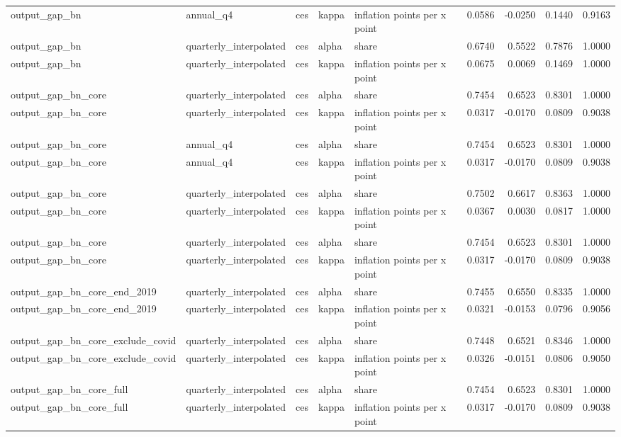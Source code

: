 \begin{tabular}{lllllrrrr}
output\_gap\_bn & annual\_q4 & ces & kappa & inflation points per x point & 0.0586 & -0.0250 & 0.1440 & 0.9163 \\
output\_gap\_bn & quarterly\_interpolated & ces & alpha & share & 0.6740 & 0.5522 & 0.7876 & 1.0000 \\
output\_gap\_bn & quarterly\_interpolated & ces & kappa & inflation points per x point & 0.0675 & 0.0069 & 0.1469 & 1.0000 \\
output\_gap\_bn\_core & quarterly\_interpolated & ces & alpha & share & 0.7454 & 0.6523 & 0.8301 & 1.0000 \\
output\_gap\_bn\_core & quarterly\_interpolated & ces & kappa & inflation points per x point & 0.0317 & -0.0170 & 0.0809 & 0.9038 \\
output\_gap\_bn\_core & annual\_q4 & ces & alpha & share & 0.7454 & 0.6523 & 0.8301 & 1.0000 \\
output\_gap\_bn\_core & annual\_q4 & ces & kappa & inflation points per x point & 0.0317 & -0.0170 & 0.0809 & 0.9038 \\
output\_gap\_bn\_core & quarterly\_interpolated & ces & alpha & share & 0.7502 & 0.6617 & 0.8363 & 1.0000 \\
output\_gap\_bn\_core & quarterly\_interpolated & ces & kappa & inflation points per x point & 0.0367 & 0.0030 & 0.0817 & 1.0000 \\
output\_gap\_bn\_core & quarterly\_interpolated & ces & alpha & share & 0.7454 & 0.6523 & 0.8301 & 1.0000 \\
output\_gap\_bn\_core & quarterly\_interpolated & ces & kappa & inflation points per x point & 0.0317 & -0.0170 & 0.0809 & 0.9038 \\
output\_gap\_bn\_core\_end\_2019 & quarterly\_interpolated & ces & alpha & share & 0.7455 & 0.6550 & 0.8335 & 1.0000 \\
output\_gap\_bn\_core\_end\_2019 & quarterly\_interpolated & ces & kappa & inflation points per x point & 0.0321 & -0.0153 & 0.0796 & 0.9056 \\
output\_gap\_bn\_core\_exclude\_covid & quarterly\_interpolated & ces & alpha & share & 0.7448 & 0.6521 & 0.8346 & 1.0000 \\
output\_gap\_bn\_core\_exclude\_covid & quarterly\_interpolated & ces & kappa & inflation points per x point & 0.0326 & -0.0151 & 0.0806 & 0.9050 \\
output\_gap\_bn\_core\_full & quarterly\_interpolated & ces & alpha & share & 0.7454 & 0.6523 & 0.8301 & 1.0000 \\
output\_gap\_bn\_core\_full & quarterly\_interpolated & ces & kappa & inflation points per x point & 0.0317 & -0.0170 & 0.0809 & 0.9038 \\

\end{tabular}
